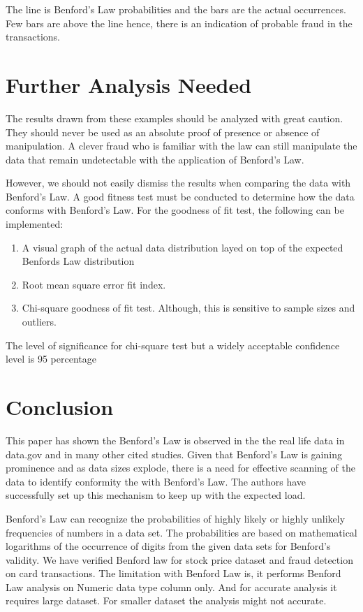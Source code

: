 The line is Benford’s Law probabilities and the bars are 
the actual occurrences. Few bars are above the line hence,
there is an indication of probable fraud in the transactions.


\section{Further Analysis Needed}
The results drawn from these examples should 
be analyzed with great caution. They should 
never be used as an absolute proof of presence 
or absence of manipulation. A clever fraud who 
is familiar with the law can still manipulate 
the data that remain undetectable with the 
application of Benford’s Law.

However, we should not easily dismiss the results 
when comparing the data with Benford’s Law. 
A good fitness test must be conducted to determine 
how the data conforms with Benford’s Law.
For the goodness of fit test, the following can be implemented:

\begin{enumerate}
\item A visual graph of the actual data distribution 
layed on top of the expected Benfords Law distribution
\item Root mean square error fit index.
\item Chi-square goodness of fit test. Although, 
this is sensitive to sample sizes and outliers.
\end{enumerate}

The level of significance for chi-square test 
but a widely acceptable confidence level is 95 percentage

\section{Conclusion}
This paper has shown the Benford’s Law is observed in 
the the real life data in data.gov and in many other 
cited studies. Given that Benford’s Law is gaining prominence 
and as data sizes explode, there is a need for effective scanning
of the data to identify conformity the with Benford’s Law. 
The authors have successfully set up this mechanism to 
keep up with the expected load.


Benford’s Law can recognize the probabilities of highly  
likely or highly unlikely frequencies of numbers in a data set.
The probabilities are based on mathematical logarithms of the 
occurrence of digits from the given data sets for Benford's 
validity. We have verified Benford law for stock price 
dataset and fraud detection on card transactions.
The limitation with Benford Law is, it performs 
Benford Law analysis on Numeric data type column only. 
And for accurate analysis it requires large dataset. 
For smaller dataset the analysis might not accurate.

